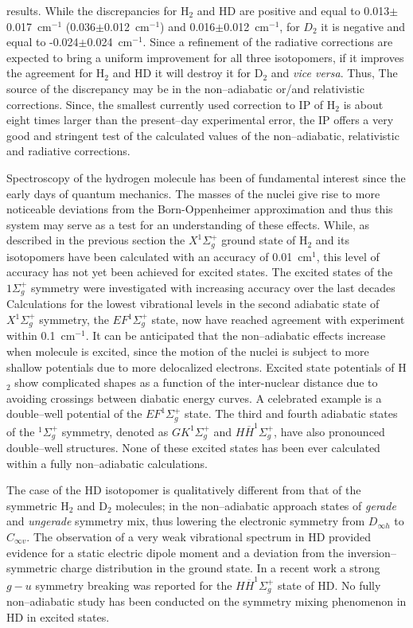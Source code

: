 results. While the discrepancies for H$_2$ and HD are positive
and equal to 0.013$\pm$0.017~cm$^{-1}$ (0.036$\pm$0.012~cm$^{-1}$)
and 0.016$\pm$0.012~cm$^{-1}$, for $D_2$ it is negative
and equal to -0.024$\pm$0.024~cm$^{-1}$.
Since  a refinement of the radiative corrections are expected
to bring a uniform improvement for all three isotopomers, if
it improves the agreement for H$_2$ and HD it will destroy
it for D$_2$ and {\it vice versa}. Thus, The source of the discrepancy
may be in the non--adiabatic or/and relativistic corrections.
Since, the smallest currently used correction to IP of H$_2$
is about eight times larger than the present--day experimental error,
the IP offers a very good and stringent test of the
calculated values of the non--adiabatic, relativistic and
radiative corrections.

Spectroscopy of the hydrogen molecule has been of fundamental
interest since the early days of quantum mechanics.
The masses of the nuclei give rise to more noticeable
deviations from the Born-Oppenheimer approximation
and thus this system  may serve as a test for an
understanding of these effects. While, as described in the
previous section the $X^1\Sigma_g^+$ ground state of H$_2$
and its isotopomers have been calculated with an accuracy
of 0.01~cm$^1$, this level of accuracy has not yet been
achieved for excited states. The excited states of the
$1\Sigma_g^+$ symmetry were investigated with increasing
accuracy over the last decades\cite{w1,w2}
Calculations for the lowest vibrational levels in the second adiabatic state
of $X^1\Sigma_g^+$ symmetry, the $EF^1\Sigma_g^+$ state,
now have reached agreement with experiment within 0.1~cm$^{-1}$.
It can be anticipated that the non--adiabatic
effects increase when molecule is excited, since
the motion of the nuclei is subject to more shallow
potentials due to more delocalized electrons.
Excited state potentials of H$_2$ show complicated
shapes as a function of the inter-nuclear distance  due
to avoiding crossings between diabatic energy curves.
A celebrated example is a double--well potential of the
$EF^1\Sigma_g^+$ state. The third and fourth adiabatic states of
the $^1\Sigma_g^+$ symmetry, denoted as $GK^1\Sigma_g^+$
and $H\overline{H}^1\Sigma_g^+$,
have also  pronounced double--well structures.
None of these excited states has been ever calculated
within a fully non--adiabatic calculations.


The case of the HD isotopomer is qualitatively different
from that of the symmetric H$_2$ and D$_2$ molecules;
in the non--adiabatic approach states of {\it gerade}
and {\it ungerade} symmetry mix, thus lowering the
electronic symmetry from $D_{\infty h}$ to $C_{\infty v}$.
The observation of a very weak vibrational spectrum in HD
provided evidence for a static electric dipole moment
and a deviation from the inversion--symmetric charge
distribution in the ground state.
In a recent work\cite{w28} a strong $g-u$
symmetry breaking was reported for the $H\overline{H}^1\Sigma_g^+$
state of HD. No fully non--adiabatic study has been
conducted on the symmetry mixing phenomenon in HD in
excited states.




